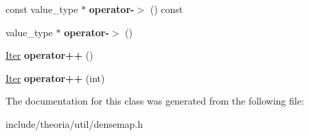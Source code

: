 \begin{DoxyCompactItemize}
const value\+\_\+type $\ast$ {\bfseries operator-\/$>$} () const
\item 
\mbox{\label{classtheoria_1_1util_1_1densemap_1_1Iter_acf52921e292fe9aea8383a810dc54aa3}} 
value\+\_\+type $\ast$ {\bfseries operator-\/$>$} ()
\item 
\mbox{\label{classtheoria_1_1util_1_1densemap_1_1Iter_a484492c01c0db1a25dc4e475d99ba82f}} 
\hyperlink{classtheoria_1_1util_1_1densemap_1_1Iter}{Iter} {\bfseries operator++} ()
\item 
\mbox{\label{classtheoria_1_1util_1_1densemap_1_1Iter_aa31a8c83fd8fefd48b6d43b778acbee5}} 
\hyperlink{classtheoria_1_1util_1_1densemap_1_1Iter}{Iter} {\bfseries operator++} (int)
\end{DoxyCompactItemize}


The documentation for this class was generated from the following file\+:\begin{DoxyCompactItemize}
\item 
include/theoria/util/densemap.\+h\end{DoxyCompactItemize}
